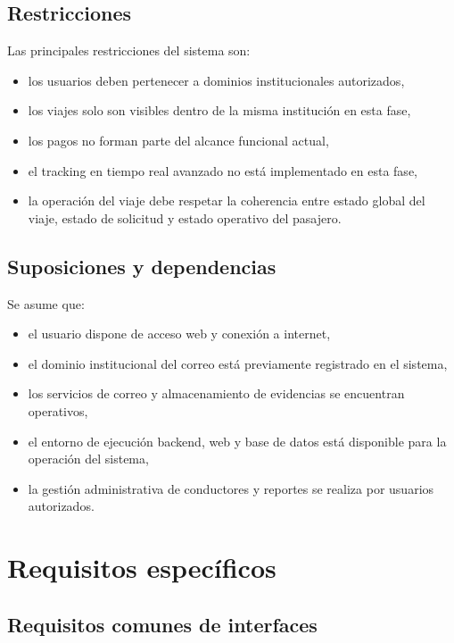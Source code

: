 \documentclass[12pt]{article}
\begin{document}
\subsection{Restricciones}

Las principales restricciones del sistema son:

\begin{itemize}[leftmargin=1.2cm]
    \item los usuarios deben pertenecer a dominios institucionales autorizados,
    \item los viajes solo son visibles dentro de la misma instituci\'on en esta fase,
    \item los pagos no forman parte del alcance funcional actual,
    \item el tracking en tiempo real avanzado no est\'a implementado en esta fase,
    \item la operaci\'on del viaje debe respetar la coherencia entre estado global del viaje, estado de solicitud y estado operativo del pasajero.
\end{itemize}

\subsection{Suposiciones y dependencias}

Se asume que:

\begin{itemize}[leftmargin=1.2cm]
    \item el usuario dispone de acceso web y conexi\'on a internet,
    \item el dominio institucional del correo est\'a previamente registrado en el sistema,
    \item los servicios de correo y almacenamiento de evidencias se encuentran operativos,
    \item el entorno de ejecuci\'on backend, web y base de datos est\'a disponible para la operaci\'on del sistema,
    \item la gesti\'on administrativa de conductores y reportes se realiza por usuarios autorizados.
\end{itemize}

\section{Requisitos espec\'ificos}

\subsection{Requisitos comunes de interfaces}
\end{document}
